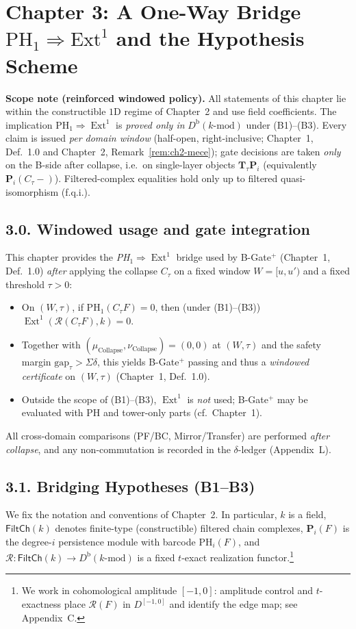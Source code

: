 \documentclass[11pt]{article}
\DeclareMathOperator{\Ext}{Ext}
\numberwithin{equation}{section}
\theoremstyle{definition}
\begin{document}
\section{Chapter 3: A One-Way Bridge \texorpdfstring{$\mathrm{PH}_1\!\Rightarrow\!\mathrm{Ext}^1$}{PH1⇒Ext1} and the Hypothesis Scheme}

\noindent\textbf{Scope note (reinforced windowed policy).}
All statements of this chapter lie within the constructible $1$D regime of Chapter~2 and use field coefficients.
The implication $\mathrm{PH}_1\Rightarrow \Ext^1$ is \emph{proved only in} $D^{\mathrm{b}}(k\text{-mod})$ under (B1)–(B3).
Every claim is issued \emph{per domain window} (half-open, right-inclusive; Chapter~1, Def.~1.0 and Chapter~2, Remark~\ref{rem:ch2-mece}); gate decisions are taken \emph{only} on the B-side after collapse, i.e.\ on single-layer objects $\mathbf{T}_\tau\mathbf{P}_i$ (equivalently $\mathbf{P}_i(C_\tau -)$).
Filtered-complex equalities hold only up to filtered quasi-isomorphism (f.q.i.).

\subsection*{3.0. Windowed usage and gate integration}
This chapter provides the \emph{PH$_1\!\Rightarrow\!\Ext^1$} bridge used by B-Gate$^{+}$ (Chapter~1, Def.~1.0) \emph{after} applying the collapse $C_\tau$ on a fixed window $W=[u,u')$ and a fixed threshold $\tau>0$:
\begin{itemize}
  \item On $(W,\tau)$, if $\mathrm{PH}_1(C_\tau F)=0$, then (under (B1)–(B3)) $\Ext^1(\mathcal{R}(C_\tau F),k)=0$.
  \item Together with $(\mu_{\mathrm{Collapse}},\nu_{\mathrm{Collapse}})=(0,0)$ at $(W,\tau)$ and the safety margin $\mathrm{gap}_\tau>\Sigma\delta$, this yields B-Gate$^{+}$ passing and thus a \emph{windowed certificate} on $(W,\tau)$ (Chapter~1, Def.~1.0).
  \item Outside the scope of (B1)–(B3), $\Ext^1$ is \emph{not} used; B-Gate$^{+}$ may be evaluated with PH and tower-only parts (cf.\ Chapter~1).
\end{itemize}
All cross-domain comparisons (PF/BC, Mirror/Transfer) are performed \emph{after collapse}, and any non-commutation is recorded in the $\delta$-ledger (Appendix~L).

\subsection*{3.1. Bridging Hypotheses (B1–B3)}
We fix the notation and conventions of Chapter~2. In particular, \(k\) is a field, \(\mathsf{FiltCh}(k)\) denotes finite-type (constructible) filtered chain complexes, \(\mathbf{P}_i(F)\) is the degree-\(i\) persistence module with barcode \(\mathrm{PH}_i(F)\), and \(\mathcal{R}:\mathsf{FiltCh}(k)\to D^{\mathrm{b}}(k\text{-mod})\) is a fixed $t$-exact realization functor.\footnote{We work in cohomological amplitude \([-1,0]\): amplitude control and $t$-exactness place $\mathcal{R}(F)$ in $D^{[-1,0]}$ and identify the edge map; see Appendix~C.}
\end{document}
